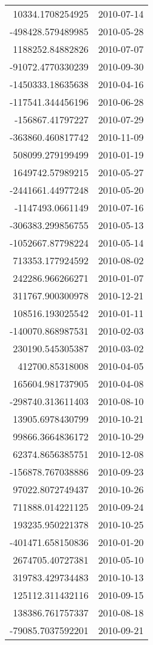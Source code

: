 \begin{tabular}{r | l}
10334.1708254925 & 2010-07-14 \\
-498428.579489985 & 2010-05-28 \\
1188252.84882826 & 2010-07-07 \\
-91072.4770330239 & 2010-09-30 \\
-1450333.18635638 & 2010-04-16 \\
-117541.344456196 & 2010-06-28 \\
-156867.41797227 & 2010-07-29 \\
-363860.460817742 & 2010-11-09 \\
508099.279199499 & 2010-01-19 \\
1649742.57989215 & 2010-05-27 \\
-2441661.44977248 & 2010-05-20 \\
-1147493.0661149 & 2010-07-16 \\
-306383.299856755 & 2010-05-13 \\
-1052667.87798224 & 2010-05-14 \\
713353.177924592 & 2010-08-02 \\
242286.966266271 & 2010-01-07 \\
311767.900300978 & 2010-12-21 \\
108516.193025542 & 2010-01-11 \\
-140070.868987531 & 2010-02-03 \\
230190.545305387 & 2010-03-02 \\
412700.85318008 & 2010-04-05 \\
165604.981737905 & 2010-04-08 \\
-298740.313611403 & 2010-08-10 \\
13905.6978430799 & 2010-10-21 \\
99866.3664836172 & 2010-10-29 \\
62374.8656385751 & 2010-12-08 \\
-156878.767038886 & 2010-09-23 \\
97022.8072749437 & 2010-10-26 \\
711888.014221125 & 2010-09-24 \\
193235.950221378 & 2010-10-25 \\
-401471.658150836 & 2010-01-20 \\
2674705.40727381 & 2010-05-10 \\
319783.429734483 & 2010-10-13 \\
125112.311432116 & 2010-09-15 \\
138386.761757337 & 2010-08-18 \\
-79085.7037592201 & 2010-09-21 \\

\end{tabular}
